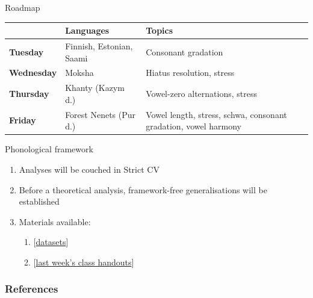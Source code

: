 \documentclass[10 pt, handout]{beamer}
\begin{document}
\begin{frame}{Roadmap}

\begin{table}[]
\begin{tabular}{llp{}}
\toprule
          & \textbf{Languages}                   & \textbf{Topics}                                           \\
          \midrule
\textbf{Tuesday}   & Finnish, Estonian, Saami    & Consonant gradation                              \\
\addlinespace[0.2cm]
\textbf{Wednesday} & Moksha                      & Hiatus resolution, stress                        \\
\addlinespace[0.2cm]
\textbf{Thursday}  & Khanty (Kazym d.)      & Vowel-zero alternations, stress                  \\
\addlinespace[0.2cm]
\textbf{Friday}    & Forest Nenets (Pur d.) & Vowel length, stress, schwa, consonant gradation, vowel harmony \\
\bottomrule
\end{tabular}
\end{table}
\end{frame}

\begin{frame}{Phonological framework}

	\begin{enumerate}[$\gg$]
		\item Analyses will be couched in Strict CV
		\item Before a theoretical analysis, framework-free generalisations will be established
		\item Materials available:
			\begin{enumerate}[$\cdot$]
			\normalsize
			\setlength\itemsep{0em}
				\item {[\href{link}{datasets}]}
				\item {[\href{link}{last week's class handouts}]}
			\end{enumerate}
	\end{enumerate}

\end{frame}

%
%
%
%
%

\begin{frame}[allowframebreaks]
\frametitle{References}
%
\printbibliography
\end{frame}
\end{document}
